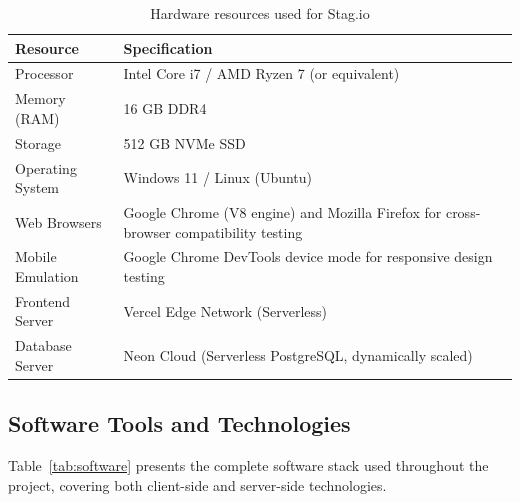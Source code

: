 \begin{table}[H]
\centering
\caption{Hardware resources used for Stag.io}
\label{tab:hardware}
\begin{tabular}{|p{3.5cm}|p{10.5cm}|}
\hline
\textbf{Resource} & \textbf{Specification} \\
\hline
Processor & Intel Core i7 / AMD Ryzen 7 (or equivalent) \\
\hline
Memory (RAM) & 16 GB DDR4 \\
\hline
Storage & 512 GB NVMe SSD \\
\hline
Operating System & Windows 11 / Linux (Ubuntu) \\
\hline
Web Browsers & Google Chrome (V8 engine) and Mozilla Firefox for cross-browser compatibility testing \\
\hline
Mobile Emulation & Google Chrome DevTools device mode for responsive design testing \\
\hline
Frontend Server & Vercel Edge Network (Serverless) \\
\hline
Database Server & Neon Cloud (Serverless PostgreSQL, dynamically scaled) \\
\hline
\end{tabular}
\end{table}

\subsection{Software Tools and Technologies}

Table~\ref{tab:software} presents the complete software stack used throughout the project, covering both client-side and server-side technologies.

